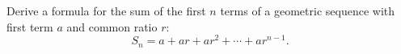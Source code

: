 Derive a formula for the sum of the first $n$ terms of a geometric sequence with first term $a$ and common ratio $r$:
\[S_n=a+ar+ar^2+\cdots+ar^{n-1}.\]
